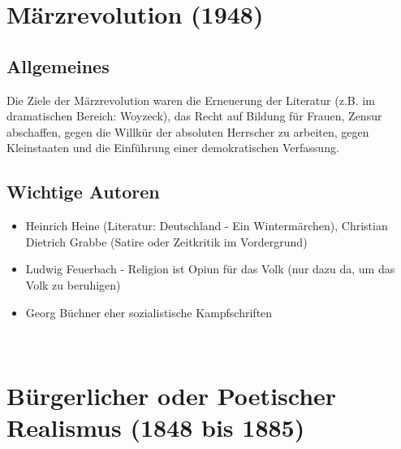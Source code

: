 \documentclass[12pt,a4paper]{article}
\begin{document}
\newpage

\section{Märzrevolution (1948)}

\subsection{Allgemeines}
Die Ziele der Märzrevolution waren die Erneuerung der Literatur (z.B. im dramatischen Bereich: Woyzeck), das Recht auf Bildung für Frauen, Zensur abschaffen, gegen die Willkür der absoluten Herrscher zu arbeiten, gegen Kleinstaaten und die Einführung einer demokratischen Verfassung.
\newline
\newline
\subsection{Wichtige Autoren}

	\begin{itemize}
	\item Heinrich Heine (Literatur: Deutschland - Ein Wintermärchen), Christian Dietrich Grabbe (Satire oder Zeitkritik im Vordergrund)
	\item Ludwig Feuerbach - Religion ist Opiun für das Volk (nur dazu da, um das Volk zu beruhigen)
	\item Georg Büchner eher sozialistische Kampfschriften
	\end{itemize}\

\newpage

\section{Bürgerlicher oder Poetischer Realismus (1848 bis 1885)}
\end{document}

